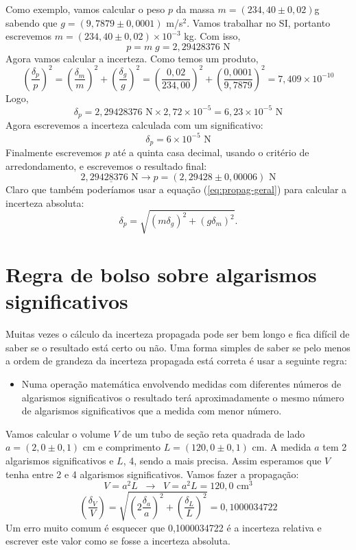 Como exemplo, vamos calcular o peso $p$ da massa $m=(234,\!40\pm 0,02)$g sabendo que $g=(9,\!7879\pm 0,\!0001)$ m/s$^2$. 
Vamos trabalhar no SI, portanto escrevemos $m=(234,\!40\pm 0,\!02)\times 10^{-3}$ kg. Com isso,
%
\[
 p =  m \;   g = 2,\!29428376 \mbox{ N}
\]
%
Agora vamos calcular a incerteza. Como temos um produto,
\[
\left(\frac{\delta_p}{  p}\right)^2=\left(\frac{\delta_m}{  m}\right)^2+\left(\frac{\delta_g}{  g}\right)^2=\left(\frac{0,\!02}{234,\!00}\right)^2+\left(\frac{0,\!0001}{9,\!7879}\right)^2=7,\!409\times 10^{-10}
\]
Logo, 
\[
\delta_p=2,\!29428376 \mbox{ N}\times 2,\!72 \times 10^{-5}=6,\!23\times 10^{-5} \mbox{ N}
\]
Agora escrevemos a incerteza calculada com um significativo: 
\[
\delta_p = 6\times 10^{-5} \mbox{ N}
\]
Finalmente escrevemos $  p$ até a quinta casa decimal, usando o critério de arredondamento, e escrevemos o resultado final:
\[
2,\!2942\underline{8}376 \mbox{ N}\rightarrow p = (2,\!29428\pm 0,\!00006)\mbox{ N}
\]
%
Claro que também poderíamos usar a equação (\ref{eq:propag-geral}) para calcular a incerteza absoluta:
\[
\delta_p =  \sqrt{ (  m\delta_g)^2+(  g \delta_m)^2}.
\]
%
%


%

%
%
%
\section*{Regra de bolso sobre algarismos significativos}
%
Muitas vezes o cálculo da incerteza propagada pode ser bem longo e fica difícil de saber se o resultado está certo ou não. Uma forma simples de saber se pelo menos a ordem de grandeza da incerteza propagada está correta é usar a seguinte regra:
%
\begin{itemize}
%
\item Numa operação matemática envolvendo medidas com diferentes números de algarismos significativos o resultado terá aproximadamente o mesmo número de algarismos significativos que a medida com menor número.
%
\end{itemize}
%
%

Vamos calcular o volume $V$ de um tubo de seção reta quadrada de lado $a=(2,\!0\pm0,\!1)$ cm e comprimento $L=(120,\!0\pm 0,\!1)$ cm.  
A medida $a$ tem 2 algarismos significativos e $L$, 4, sendo a mais precisa. Assim esperamos que $V$ tenha entre 2 e 4 algarismos significativos. Vamos fazer a propagação:
\[
V=a^2L\;\;\rightarrow\;\;   V =   a^2  L= 120,\!0\mbox{ cm}^3 
\]
%
\[
\left(\frac{\delta_V}{  V}\right)=\sqrt{\left(2\frac{\delta_a}{  a}\right)^2+\left(\frac{\delta_L}{  L}\right)^2}=0,\!1000034722
\]
Um erro muito comum é esquecer que 0,1000034722 é a incerteza  relativa e escrever este valor como se fosse a incerteza absoluta.


